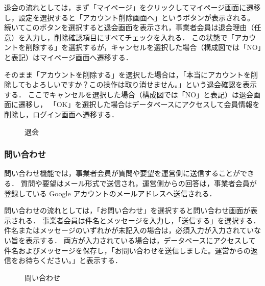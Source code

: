 退会の流れとしては，まず「マイページ」をクリックしてマイページ画面に遷移し，設定を選択すると「アカウント削除画面へ」というボタンが表示される。
続いてこのボタンを選択すると退会画面を表示され，事業者会員は退会理由（任意）を入力し，削除確認項目にすべてチェックを入れる．
この状態で「アカウントを削除する」を選択するが，キャンセルを選択した場合（構成図では「NO」と表記）はマイページ画面へ遷移する．

そのまま「アカウントを削除する」を選択した場合は，「本当にアカウントを削除してもよろしいですか？この操作は取り消せません。」という退会確認を表示する．
ここでキャンセルを選択した場合（構成図では「NO」と表記）は退会画面に遷移し，
「OK」を選択した場合はデータベースにアクセスして会員情報を削除し，ログイン画面へ遷移する．


\begin{figure}[H]
    \centering
    
    \caption{退会}
\end{figure}

\subsubsection{問い合わせ}
問い合わせ機能では，事業者会員が質問や要望を運営側に送信することができる．
質問や要望はメール形式で送信され，運営側からの回答は，事業者会員が登録している Google アカウントのメールアドレスへ送信される．

問い合わせの流れとしては，「お問い合わせ」を選択すると問い合わせ画面が表示される．
事業者会員は件名とメッセージを入力し，「送信する」を選択する．件名またはメッセージのいずれかが未記入の場合は，必須入力が入力されていない旨を表示する．
両方が入力されている場合は，データベースにアクセスして件名およびメッセージを保存し，「お問い合わせを送信しました。運営からの返信をお待ちください。」と表示する．

\begin{figure}[H]
    \centering
    
    \caption{問い合わせ}
\end{figure}